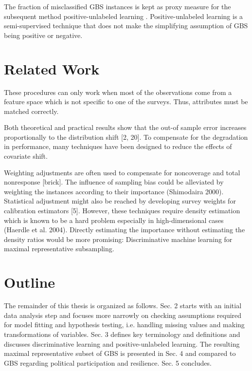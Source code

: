 The fraction of misclassified GBS instances is kept as proxy measure for the subsequent method positive-unlabeled learning \cite{denis, elkan, claesen}. Positive-unlabeled learning is a semi-supervised technique that does not make the simplifying assumption of GBS being positive or negative.

\section{Related Work}

These procedures can only work when most of the observations come from a feature space which is not specific to one of the surveys. Thus, attributes must be matched correctly. 

Both theoretical and practical results show that the out-of sample error increases proportionally to the distribution shift [2, 20]. To compensate for the degradation in performance, many techniques have been designed to reduce the effects of covariate shift.

Weighting adjustments are often used to compensate for noncoverage and total nonresponse [brick]. The influence of sampling bias could be alleviated by weighting the instances according to their importance (Shimodaira 2000). Statistical adjustment might also be reached by developing survey weights for calibration estimators [5]. However, these techniques require density estimation which is known to be a hard problem especially in high-dimensional cases (Haerdle et al. 2004). Directly estimating the importance without estimating the density ratios would be more promising: Discriminative machine learning for maximal representative subsampling.

\section{Outline}

The remainder of this thesis is organized as follows. Sec. 2 starts with an initial data analysis step and focuses more narrowly on checking assumptions required for model fitting and hypothesis testing, i.e. handling missing values and making transformations of variables. Sec. 3 defines key terminology and definitions and discusses discriminative learning and positive-unlabeled learning. The resulting maximal representative subset of GBS is presented in Sec. 4 and compared to GBS regarding political participation and resilience. Sec. 5 concludes.
